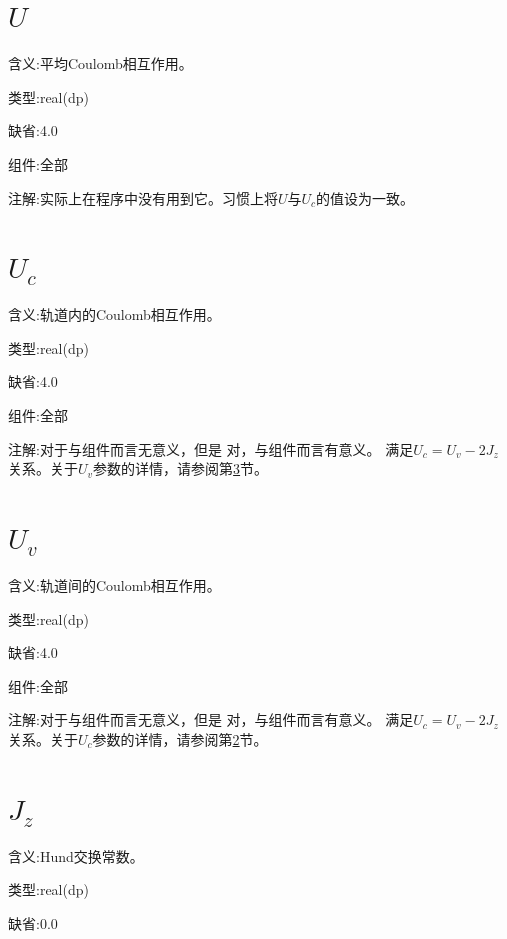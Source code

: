 \section{$U$     }
\label{sec:U}

{\color{red}含义}:平均Coulomb相互作用。

{\color{green}类型}:real(dp)

{\color{blue}缺省}:4.0

{\color{brown}组件}:全部

{\color{purple}注解}:实际上在程序中没有用到它。习惯上将$U$与$U_{c}$的值设为一致。

\section{$U_{c}$    }
\label{sec:Uc}

{\color{red}含义}:轨道内的Coulomb相互作用。

{\color{green}类型}:real(dp)

{\color{blue}缺省}:4.0

{\color{brown}组件}:全部

{\color{purple}注解}:对于{\begonia}与{\lavender}组件而言无意义，但是
对{\azalea}，{\gardenia}与{\narcissus}组件而言有意义。
满足$U_{c} = U_{v} - 2J_{z}$关系。关于$U_{v}$参数的详情，请参阅第\ref{sec:Uv}节。

\section{$U_{v}$    }
\label{sec:Uv}

{\color{red}含义}:轨道间的Coulomb相互作用。

{\color{green}类型}:real(dp)

{\color{blue}缺省}:4.0

{\color{brown}组件}:全部

{\color{purple}注解}:对于{\begonia}与{\lavender}组件而言无意义，但是
对{\azalea}，{\gardenia}与{\narcissus}组件而言有意义。
满足$U_{c} = U_{v} - 2J_{z}$关系。关于$U_{c}$参数的详情，请参阅第\ref{sec:Uc}节。

\section{$J_{z}$    }
\label{sec:Jz}

{\color{red}含义}:Hund交换常数。

{\color{green}类型}:real(dp)

{\color{blue}缺省}:0.0

